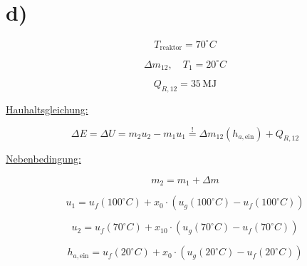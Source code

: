 

\section*{d)}
\[
T_{\text{reaktor}} = 70^\circ C
\]

\[
\Delta m_{12}, \quad T_1 = 20^\circ C
\]

\[
Q_{R,12} = 35 \, \text{MJ}
\]

\underline{Hauhaltsgleichung:}

\[
\Delta E = \Delta U = m_2 u_2 - m_1 u_1 \stackrel{!}{=} \Delta m_{12} \left( h_{a, \text{ein}} \right) + Q_{R,12}
\]

\underline{Nebenbedingung:}

\[
m_2 = m_1 + \Delta m
\]

\[
u_1 = u_f (100^\circ C) + x_0 \cdot (u_g (100^\circ C) - u_f (100^\circ C))
\]

\[
u_2 = u_f (70^\circ C) + x_{10} \cdot (u_g (70^\circ C) - u_f (70^\circ C))
\]

\[
h_{a, \text{ein}} = u_f (20^\circ C) + x_0 \cdot (u_g (20^\circ C) - u_f (20^\circ C))
\]